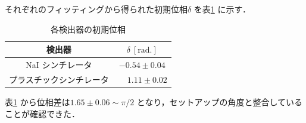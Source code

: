 それぞれのフィッティングから得られた初期位相$\delta$ を表\ref{tab:InitPhases} に示す．
\begin{table}[h]
	\centering
	\caption{各検出器の初期位相}
	\begin{tabular}{cc}\toprule
	検出器 & $\delta~[\mathrm{rad.}]$ \\ \midrule
	NaI シンチレータ & $-0.54 \pm 0.04$ \\
	プラスチックシンチレータ & $\phantom{-}1.11 \pm 0.02$ \\ \bottomrule
	\end{tabular}\label{tab:InitPhases}
\end{table}%
表\ref{tab:InitPhases} から位相差は$1.65 \pm 0.06 \sim \pi / 2$ となり，セットアップの角度と整合していることが確認できた．

%
